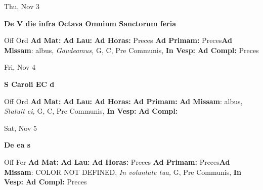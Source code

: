 \documentclass[10pt]{memoir}
\begin{document}
\begin{center}
\begin{minipage}{3.5in}
\vspace{2em}
\begin{center}Thu, Nov 3
\end{center}
\textbf{ \large De V die infra Octava Omnium Sanctorum
\textnormal{\normalsize feria}}

\begin{justify}Off Ord
\textbf{Ad Mat: }
\textbf{Ad Lau: }
\textbf{Ad Horas: }Preces
\textbf{Ad Primam: }Preces\textbf{Ad Missam}: albus, \textit{Gaudeamus,} G, C, Pre Communis, 
\textbf{In Vesp: }
\textbf{Ad Compl: }Preces
\end{justify}
\end{minipage}
\end{center}

\begin{center}
\begin{minipage}{3.5in}
\vspace{2em}
\begin{center}Fri, Nov 4
\end{center}
\textbf{ \large S Caroli EC
\textnormal{\normalsize d}}

\begin{justify}Off Ord
\textbf{Ad Mat: }
\textbf{Ad Lau: }
\textbf{Ad Horas: }
\textbf{Ad Primam: }\textbf{Ad Missam}: albus, \textit{Statuit ei,} G, C, Pre Communis, 
\textbf{In Vesp: }
\textbf{Ad Compl: }
\end{justify}
\end{minipage}
\end{center}

\begin{center}
\begin{minipage}{3.5in}
\vspace{2em}
\begin{center}Sat, Nov 5
\end{center}
\textbf{ \large De ea
\textnormal{\normalsize s}}

\begin{justify}Off Fer
\textbf{Ad Mat: }
\textbf{Ad Lau: }
\textbf{Ad Horas: }Preces
\textbf{Ad Primam: }Preces\textbf{Ad Missam}: COLOR NOT DEFINED, \textit{In voluntate tua,} G, Pre Communis, 
\textbf{In Vesp: }
\textbf{Ad Compl: }Preces
\end{justify}
\end{minipage}
\end{center}
\end{document}
